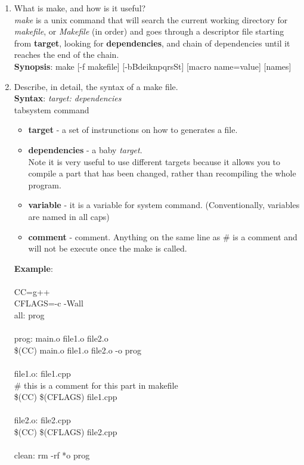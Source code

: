 \documentclass[a4paper,12pt]{article}
\begin{document}
\begin{enumerate}
\begin{itemize}
		\end{itemize}

	\item What is make, and how is it useful?
		\\
		\textit{make} is a unix command that will search the current working directory for \textit{makefile}, or \textit{Makefile} (in order) and goes through a descriptor file starting from \textbf{target}, looking for \textbf{dependencies}, and chain of dependencies until it reaches the end of the chain.
\\
\textbf{Synopsis}: make [-f makefile] [-bBdeiknpqrsSt] [macro name=value] [names]

	\item Describe, in detail, the syntax of a make file.
	\\ 
	\textbf{Syntax}: \textit{target: dependencies}\\
	\lbrack tab\rbrack  system command
	\begin{itemize}
		\item \textbf{target} -  a set of instrunctions on how to generates a file. 
		\item \textbf{dependencies} - a baby \textit{target}.
			\\ Note it is very useful to use different targets because it allows you to compile a part that has been changed, rather than recompiling the whole program.
		\item \textbf{variable} - it is a variable for system command. (Conventionally, variables are named in all caps)
		\item \textbf{comment} - comment. Anything on the same line as \# is a comment and will not be execute once the make is called.	
	\end{itemize}
\textbf{Example}:\\
\\CC=g++
\\CFLAGS=-c -Wall
\\all: prog
\\
\\prog: main.o file1.o file2.o
\\
\hspace{1in}\$(CC)  main.o file1.o file2.o -o prog
\\
\\file1.o: file1.cpp\\  \# this is a comment for this part in makefile \\
\hspace{1in}\$(CC) \$(CFLAGS) file1.cpp
\\
\\file2.o: file2.cpp\\
\hspace{1in}\$(CC) \$(CFLAGS) file2.cpp
\\
\\clean:
\hspace{1in}rm -rf *o prog


\end{enumerate}
\end{document}
